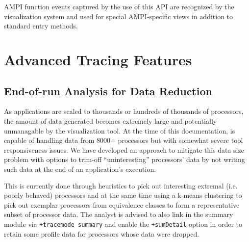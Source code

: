 \documentclass[10pt]{article}
\begin{document}
AMPI function events captured by the use of this API are recognized by
the visualization system and used for special AMPI-specific views in
addition to standard \charmpp{} entry methods.

%
%

\section{Advanced Tracing Features}
\label{sec::advanced tracing features}

\subsection{End-of-run Analysis for Data Reduction}
\label{sec::data reduction}

As applications are scaled to thousands or hundreds of thousands of
processors, the amount of data generated becomes extremely large and
potentially unmanagable by the visualization tool. At the time of this
documentation, \projections{} is capable of handling data from 8000+
processors but with somewhat severe tool responsiveness issues. We
have developed an approach to mitigate this data size problem with
options to trim-off ``uninteresting'' processors' data by not writing
such data at the end of an application's execution.

This is currently done through heuristics to pick out interesting
extremal (i.e. poorly behaved) processors and at the same time using a
k-means clustering to pick out exemplar processors from equivalence
classes to form a representative subset of processor data. The analyst
is advised to also link in the summary module via {\tt +tracemode
summary} and enable the {\tt +sumDetail} option in order to retain
some profile data for processors whose data were dropped.
\end{document}

